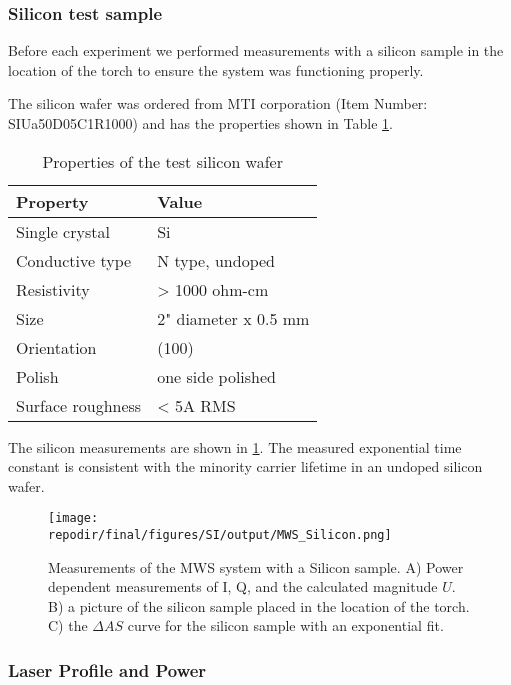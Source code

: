 \subsubsection{Silicon test sample}

Before each experiment we performed measurements with a silicon sample in the location of the torch to ensure the system was functioning properly. 

The silicon wafer was ordered from MTI corporation (Item Number: SIUa50D05C1R1000) and has the properties shown in Table \ref{table:material_properties}.

\begin{table}[h]
\centering
\begin{tabular}{|l|l|}
\hline
Property & Value \\
\hline
Single crystal & Si \\
Conductive type & N type, undoped \\
Resistivity & > 1000 ohm-cm \\
Size & 2" diameter x 0.5 mm \\
Orientation & (100) \\
Polish & one side polished \\
Surface roughness & < 5A RMS \\
\hline
\end{tabular}
\caption{Properties of the test silicon wafer}
\label{table:material_properties}
\end{table}

The silicon measurements are shown in \ref{fig:SI_MWS_Silicon}. The measured exponential time constant is consistent with the minority carrier lifetime in an undoped silicon wafer. \cite{tyagiMINORITYCARRIERRECOMBINATION, delalamoModellingMinoritycarrierTransport1987} 

\begin{figure}[]
\centering
\texttt{[image: \\repodir/final/figures/SI/output/MWS\_Silicon.png]}
\caption{Measurements of the MWS system with a Silicon sample. A) Power dependent measurements of I, Q, and the calculated magnitude $U$. B) a picture of the silicon sample placed in the location of the torch. C) the $\Delta AS$ curve for the silicon sample with an exponential fit. }
\label{fig:SI_MWS_Silicon}
\end{figure}








\clearpage
\subsubsection{Laser Profile and Power}

